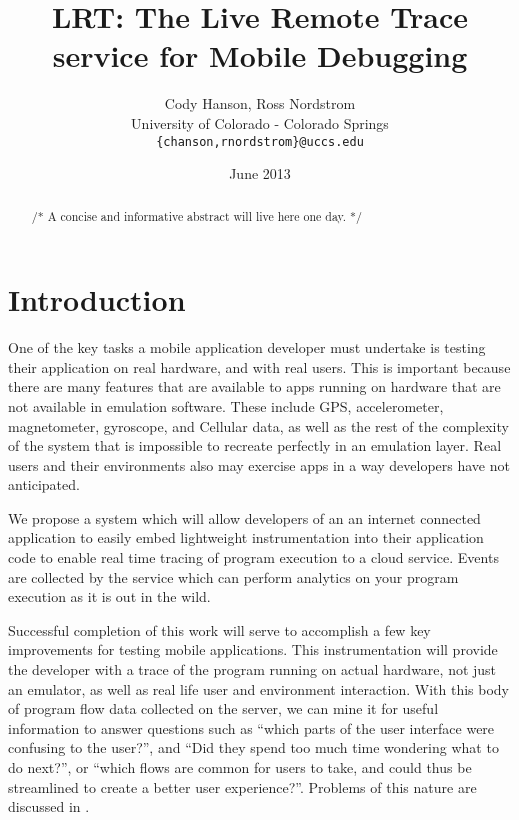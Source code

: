 \documentclass[11pt]{article}
\begin{document}
\title{LRT: The Live Remote Trace service for Mobile Debugging}
\author{Cody Hanson, Ross Nordstrom\\
        University of Colorado - Colorado Springs\\
        \texttt{\{chanson,rnordstrom\}@uccs.edu}
       }
\date{June 2013}

\maketitle

\begin{abstract}
/* A concise and informative abstract will live here one day. */

\end{abstract}

\section{Introduction}
One of the key tasks a mobile application developer must undertake is testing 
their application on real hardware, and with real users. This is important 
because there are many features that are available to apps running on hardware 
that are not available in emulation software. These include GPS, accelerometer, 
magnetometer, gyroscope, and Cellular data, as well as the rest of the 
complexity of the system that is impossible to recreate perfectly in an 
emulation layer. Real users and their environments also may exercise apps in
a way developers have not anticipated. 

We propose a system which will allow developers of an an internet connected 
application to easily embed lightweight instrumentation 
into their application code to enable real 
time tracing of program execution to a cloud service. Events are collected by 
the service which can perform analytics on your program execution as it is out 
in the wild.

Successful completion of this work will serve to accomplish a few key 
improvements for testing mobile applications. This instrumentation will provide 
the developer with a trace of the program running on actual hardware, not just 
an emulator, as well as real life user and environment interaction. With this 
body of program flow data collected on the server, we can mine it for useful 
information to answer questions such as “which parts of the user interface were 
confusing to the user?”, and “Did they spend too much time wondering what to do 
next?”, or “which flows are common for users to take, and could thus be 
streamlined to create a better user experience?”. Problems of this nature are 
discussed in \cite{WebAntiPattern}.
\end{document}

